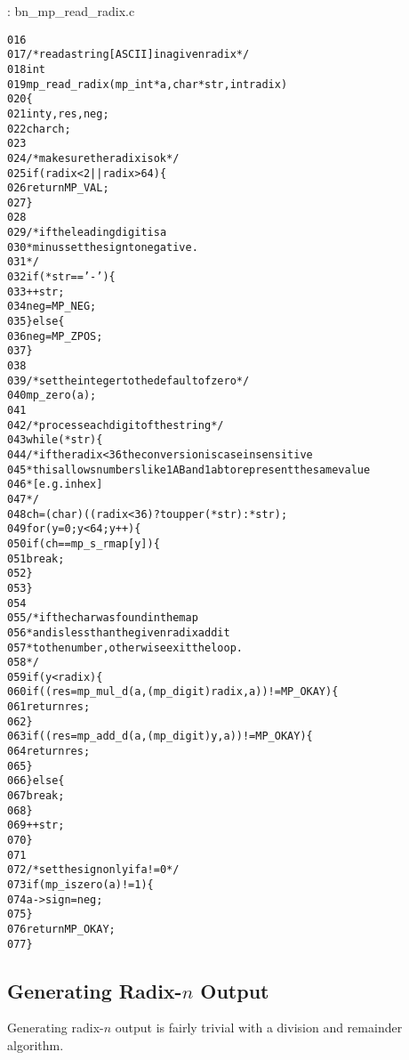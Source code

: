 \documentclass[b5paper]{book}
\begin{document}
\vspace{+3mm}\begin{small}
\hspace{-5.1mm}{\bf File}: bn\_mp\_read\_radix.c
\vspace{-3mm}
\begin{alltt}
016   
017   /* read a string [ASCII] in a given radix */
018   int
019   mp_read_radix (mp_int * a, char *str, int radix)
020   \{
021     int     y, res, neg;
022     char    ch;
023   
024     /* make sure the radix is ok */
025     if (radix < 2 || radix > 64) \{
026       return MP_VAL;
027     \}
028   
029     /* if the leading digit is a 
030      * minus set the sign to negative. 
031      */
032     if (*str == '-') \{
033       ++str;
034       neg = MP_NEG;
035     \} else \{
036       neg = MP_ZPOS;
037     \}
038   
039     /* set the integer to the default of zero */
040     mp_zero (a);
041     
042     /* process each digit of the string */
043     while (*str) \{
044       /* if the radix < 36 the conversion is case insensitive
045        * this allows numbers like 1AB and 1ab to represent the same  value
046        * [e.g. in hex]
047        */
048       ch = (char) ((radix < 36) ? toupper (*str) : *str);
049       for (y = 0; y < 64; y++) \{
050         if (ch == mp_s_rmap[y]) \{
051            break;
052         \}
053       \}
054   
055       /* if the char was found in the map 
056        * and is less than the given radix add it
057        * to the number, otherwise exit the loop. 
058        */
059       if (y < radix) \{
060         if ((res = mp_mul_d (a, (mp_digit) radix, a)) != MP_OKAY) \{
061            return res;
062         \}
063         if ((res = mp_add_d (a, (mp_digit) y, a)) != MP_OKAY) \{
064            return res;
065         \}
066       \} else \{
067         break;
068       \}
069       ++str;
070     \}
071     
072     /* set the sign only if a != 0 */
073     if (mp_iszero(a) != 1) \{
074        a->sign = neg;
075     \}
076     return MP_OKAY;
077   \}
\end{alltt}
\end{small}

\subsection{Generating Radix-$n$ Output}
Generating radix-$n$ output is fairly trivial with a division and remainder algorithm.  
\end{document}
